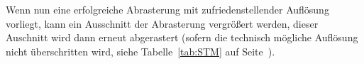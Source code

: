 Wenn nun eine erfolgreiche Abrasterung mit zufriedenstellender
Auflösung vorliegt, kann ein Ausschnitt der Abrasterung
vergrößert werden, dieser Auschnitt wird dann erneut abgerastert
(sofern die technisch mögliche Auflösung nicht überschritten wird,
siehe Tabelle~\ref{tab:STM} auf Seite~\pageref{tab:STM}).



